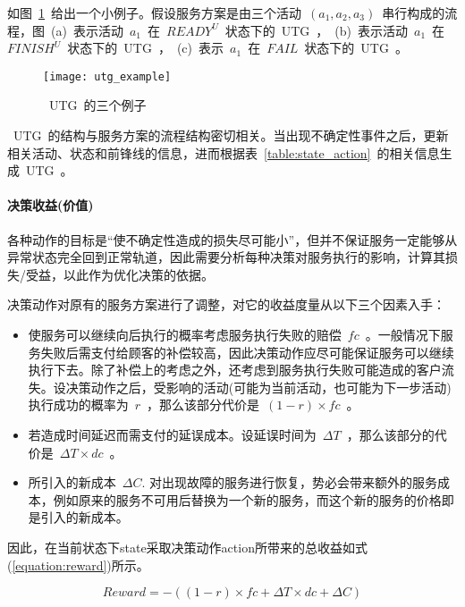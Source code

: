 如图~\ref{figure:utg_example}~给出一个小例子。假设服务方案是由三个活动~$(a_1, a_2, a_3)$~串行构成的流程，图~(a)~表示活动~$a_1$~在~$READY^U$~状态下的~UTG~，~(b)~表示活动~$a_1$~在~$FINISH^U$~状态下的~UTG~，~(c)~表示~$a_1$~在~$FAIL$~状态下的~UTG~。

\begin{figure}[htbp]
    \centering
    \texttt{[image: utg\_example]}
    \caption{~UTG~的三个例子}\label{figure:utg_example}
    \vspace{-1em}
\end{figure}

~UTG~的结构与服务方案的流程结构密切相关。当出现不确定性事件之后，更新相关活动、状态和前锋线的信息，进而根据表~\ref{table:state_action}~的相关信息生成~UTG~。

\paragraph{决策收益(价值)} 

各种动作的目标是“使不确定性造成的损失尽可能小”，但并不保证服务一定能够从异常状态完全回到正常轨道，因此需要分析每种决策对服务执行的影响，计算其损失/受益，以此作为优化决策的依据。

决策动作对原有的服务方案进行了调整，对它的收益度量从以下三个因素入手：

\begin{itemize}

\item 使服务可以继续向后执行的概率考虑服务执行失败的赔偿~$fc$~。一般情况下服务失败后需支付给顾客的补偿较高，因此决策动作应尽可能保证服务可以继续执行下去。除了补偿上的考虑之外，还考虑到服务执行失败可能造成的客户流失。设决策动作之后，受影响的活动(可能为当前活动，也可能为下一步活动)执行成功的概率为~$r$~，那么该部分代价是~$(1-r) \times fc$~。

\item 若造成时间延迟而需支付的延误成本。设延误时间为~$\Delta T$~，那么该部分的代价是~$\Delta T \times dc$~。

\item 所引入的新成本~$\Delta C$. 对出现故障的服务进行恢复，势必会带来额外的服务成本，例如原来的服务不可用后替换为一个新的服务，而这个新的服务的价格即是引入的新成本。

\end{itemize}

因此，在当前状态下state采取决策动作action所带来的总收益如式(\ref{equation:reward})所示。

\begin{equation}\label{equation:reward}
Reward =  - ((1 - r) \times fc + \Delta T \times dc + \Delta C)
\end{equation}

